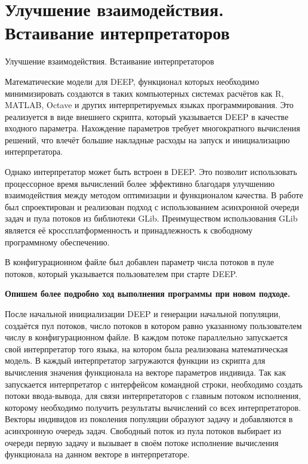 \section*{Улучшение взаимодействия.\\Встаивание интерпретаторов}
{Улучшение взаимодействия. Встаивание интерпретаторов}

Математические модели для DEEP,
функционал которых необходимо минимизировать
создаются в таких компьютерных системах расчётов
как R, MATLAB, Octave
и других интерпретируемых языках программирования.
Это реализуется в виде внешнего скрипта,
который указывается DEEP в качестве входного параметра.
Нахождение параметров требует
многократного вычисления решений,
что влечёт большие накладные расходы
на запуск и инициализацию интерпретатора.

Однако интерпретатор может быть встроен в DEEP.
Это позволит использовать процессорное время вычислений
более эффективно благодаря
улучшению взаимодействия между
методом оптимизации и
функционалом качества.
В работе был спроектирован и реализован
подход с использованием
асинхронной очереди задач и пула потоков
из библиотеки GLib.
Преимуществом использования GLib
является её кроссплатформенность
и принадлежность к свободному программному обеспечению.

В конфигурационном файле был добавлен
параметр числа потоков в пуле потоков,
который указывается пользователем
при старте DEEP.

\textbf{Опишем более подробно ход выполнения программы
при новом подходе.}

После начальной инициализации DEEP
и генерации начальной популяции,
создаётся пул потоков,
число потоков в котором равно
указанному пользователем числу в
конфигурационном файле.
В каждом потоке параллельно
запускается свой интерпретатор того языка,
на котором была реализована математическая модель.
В каждый интерпретатор загружаются
функции из скрипта
для вычисления значения функционала
на векторе параметров индивида.
Так как запускается интерпретатор
с интерфейсом командной строки,
необходимо создать потоки ввода-вывода,
для связи интерпретаторов
с главным потоком исполнения,
которому необходимо получить
результаты вычислений со всех интерпретаторов.
Векторы индивидов из поколения популяции
образуют задачу и
добавляются в асинхронную очередь задач.
Свободный поток из пула потоков
выбирает из очереди первую задачу
и вызывает в своём потоке
исполнение вычисления функционала
на данном векторе в интерпретаторе.

